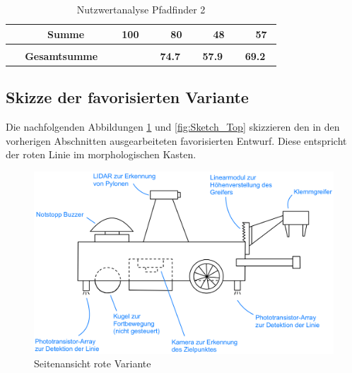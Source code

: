 \documentclass[main.tex]{subfiles} %
\begin{document}
\begin{landscape}
\begin{table}[ht]
\begin{tabular}{|p{0.11\linewidth}|p{0.18\linewidth}|p{0.085\linewidth}|p{0.057\linewidth}|p{0.07\linewidth}|p{0.057\linewidth}|p{0.07\linewidth}|p{0.057\linewidth}|p{0.07\linewidth}|}
                                                           & \textbf{Summe}                      & \textbf{100}                               &                                             & \textbf{80}                                 &   & \textbf{48}   &   & \textbf{57} \\[1pt]
            \hline
            \hline
            \multicolumn{2}{|c|}{}                         &                                     & \multicolumn{2}{c|}{}                      & \multicolumn{2}{c|}{}                       & \multicolumn{2}{c|}{}                                                             \\[-9pt]
            \multicolumn{2}{|c|}{\textbf{Gesamtsumme}}     &                                     & \multicolumn{2}{c|}{\textbf{74.7}}         & \multicolumn{2}{c|}{\textbf{57.9}}          & \multicolumn{2}{c|}{\textbf{69.2}}                                                \\[1pt]
            \hline
        \end{tabular}
        \caption{Nutzwertanalyse Pfadfinder 2}
    \end{table}

    \newpage

    \subsection{Skizze der favorisierten Variante}

    Die nachfolgenden Abbildungen \ref{fig:Sketch_Side} und \ref{fig:Sketch_Top}
    skizzieren den in den vorherigen Abschnitten ausgearbeiteten favorisierten Entwurf. Diese entspricht 
    der roten Linie im morphologischen Kasten. 

    \begin{figure}[h] %
        \centering %
        \includegraphics[width=1\textwidth]{./Skizzen/Sketch_Side.png} %
        \caption{Seitenansicht rote Variante} %
        \label{fig:Sketch_Side} %
    \end{figure}


\end{landscape}
\end{document}
